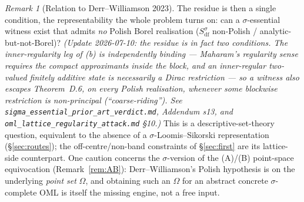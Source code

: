 \documentclass[11pt,reqno]{amsart}
\theoremstyle{plain}
\theoremstyle{definition}
\theoremstyle{remark}
\newtheorem{remark}[theorem]{Remark}
\begin{document}
\begin{remark}[Relation to Derr--Williamson 2023]
The residue is then a single condition, the representability the whole problem turns
on: can a $\sigma$-essential witness exist that admits \emph{no} Polish Borel
realisation ($S_{\mathrm{df}}^\sigma$
non-Polish / analytic-but-not-Borel)?
\emph{(Update 2026-07-10: the residue is in fact two conditions. The
inner-regularity leg of (b) is independently binding --- Maharam's
regularity sense requires the compact approximants inside the block, and an
inner-regular two-valued finitely additive state is necessarily a Dirac
restriction --- so a witness also escapes Theorem~D.6, on every Polish
realisation, whenever some blockwise restriction is non-principal
(``coarse-riding''). See
\texttt{sigma\_essential\_prior\_art\_verdict.md}, Addendum s13, and
\texttt{oml\_lattice\_regularity\_attack.md} \S10.)} This is a descriptive-set-theory question,
equivalent to the absence of a $\sigma$-Loomis--Sikorski representation
(\S\ref{sec:routes}); the off-centre/non-band constraints of \S\ref{sec:first} are its
lattice-side counterpart. One caution concerns the $\sigma$-version of the (A)/(B)
point-space equivocation (Remark~\ref{rem:AB}): Derr--Williamson's Polish hypothesis is
on the underlying \emph{point set} $\Omega$, and obtaining such an $\Omega$ for an
abstract concrete $\sigma$-complete OML is itself the missing engine, not a free input.
\end{remark}
\end{document}
